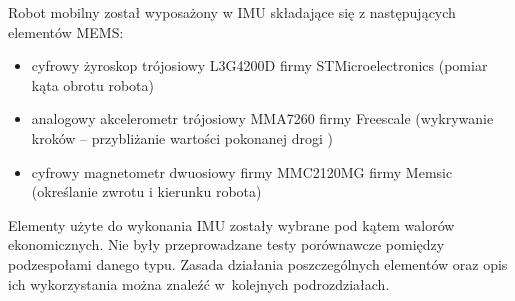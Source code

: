 Robot mobilny został wyposażony w IMU składające się z następujących elementów
MEMS:
\begin{itemize}
  \item cyfrowy żyroskop trójosiowy L3G4200D firmy STMicroelectronics (pomiar kąta obrotu robota)
  \item analogowy akcelerometr trójosiowy MMA7260 firmy Freescale (wykrywanie kroków -- przybliżanie wartości pokonanej drogi )
  \item cyfrowy magnetometr dwuosiowy firmy MMC2120MG firmy Memsic (określanie zwrotu i kierunku robota)
\end{itemize}
Elementy użyte do wykonania IMU zostały wybrane pod kątem walorów ekonomicznych. 
Nie były przeprowadzane testy porównawcze pomiędzy podzespołami danego typu.
Zasada działania poszczególnych elementów oraz opis ich wykorzystania można znaleźć w~kolejnych podrozdziałach.
